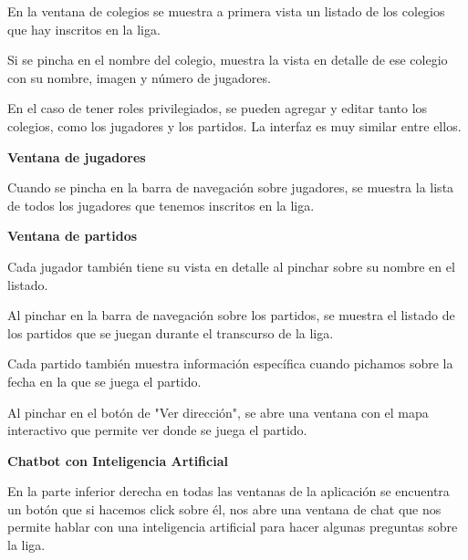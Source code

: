 En la ventana de colegios se muestra a primera vista un listado de los colegios que hay inscritos en la liga.



Si se pincha en el nombre del colegio, muestra la vista en detalle de ese colegio con su nombre, imagen y número de jugadores.


En el caso de tener roles privilegiados, se pueden agregar y editar tanto los colegios, como los jugadores y los partidos. La interfaz es muy similar entre ellos.


\textbf{Ventana de jugadores}

Cuando se pincha en la barra de navegación sobre jugadores, se muestra la lista de todos los jugadores que tenemos inscritos en la liga.


\newpage

\textbf{Ventana de partidos}

Cada jugador también tiene su vista en detalle al pinchar sobre su nombre en el listado.


Al pinchar en la barra de navegación sobre los partidos, se muestra el listado de los partidos que se juegan durante el transcurso de la liga.


Cada partido también muestra información específica cuando pichamos sobre la fecha en la que se juega el partido.


Al pinchar en el botón de "Ver dirección", se abre una ventana con el mapa interactivo que permite ver donde se juega el partido.


\textbf{Chatbot con Inteligencia Artificial}

En la parte inferior derecha en todas las ventanas de la aplicación se encuentra un botón que si hacemos click sobre él, nos abre una ventana de chat que nos permite hablar con una inteligencia artificial para hacer algunas preguntas sobre la liga.


